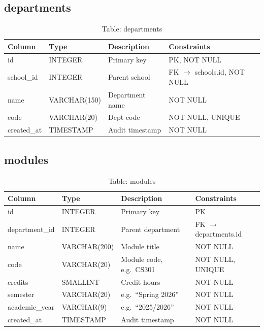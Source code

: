 \documentclass[12pt,a4paper]{report}
\begin{document}
\subsection{departments}
\begin{table}[H]
\centering\small
\caption{Table: departments}
\begin{tabularx}{\linewidth}{llXl}
\toprule
\textbf{Column} & \textbf{Type} & \textbf{Description} & \textbf{Constraints} \\
\midrule
id          & INTEGER      & Primary key                   & PK, NOT NULL \\
school\_id  & INTEGER      & Parent school                 & FK $\to$ schools.id, NOT NULL \\
name        & VARCHAR(150) & Department name               & NOT NULL \\
code        & VARCHAR(20)  & Dept code                     & NOT NULL, UNIQUE \\
created\_at & TIMESTAMP    & Audit timestamp               & NOT NULL \\
\bottomrule
\end{tabularx}
\end{table}

\subsection{modules}
\begin{table}[H]
\centering\small
\caption{Table: modules}
\begin{tabularx}{\linewidth}{llXl}
\toprule
\textbf{Column} & \textbf{Type} & \textbf{Description} & \textbf{Constraints} \\
\midrule
id              & INTEGER      & Primary key              & PK \\
department\_id  & INTEGER      & Parent department        & FK $\to$ departments.id \\
name            & VARCHAR(200) & Module title             & NOT NULL \\
code            & VARCHAR(20)  & Module code, e.g.\ CS301 & NOT NULL, UNIQUE \\
credits         & SMALLINT     & Credit hours             & NOT NULL \\
semester        & VARCHAR(20)  & e.g.\ ``Spring 2026''   & NOT NULL \\
academic\_year  & VARCHAR(9)   & e.g.\ ``2025/2026''     & NOT NULL \\
created\_at     & TIMESTAMP    & Audit timestamp          & NOT NULL \\
\bottomrule
\end{tabularx}
\end{table}
\end{document}
